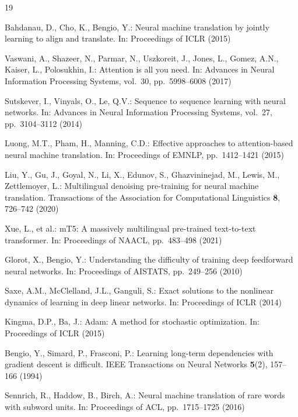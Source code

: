 \documentclass[runningheads]{llncs}
\begin{document}

\begin{thebibliography}{19}

Bahdanau, D., Cho, K., Bengio, Y.:
Neural machine translation by jointly learning to align and translate.
In: Proceedings of ICLR (2015)

Vaswani, A., Shazeer, N., Parmar, N., Uszkoreit, J., Jones, L., Gomez, A.N.,
Kaiser, L., Polosukhin, I.:
Attention is all you need.
In: Advances in Neural Information Processing Systems, vol.~30,
pp.~5998--6008 (2017)

Sutskever, I., Vinyals, O., Le, Q.V.:
Sequence to sequence learning with neural networks.
In: Advances in Neural Information Processing Systems, vol.~27,
pp.~3104--3112 (2014)

Luong, M.T., Pham, H., Manning, C.D.:
Effective approaches to attention-based neural machine translation.
In: Proceedings of EMNLP, pp.~1412--1421 (2015)

Liu, Y., Gu, J., Goyal, N., Li, X., Edunov, S., Ghazvininejad, M.,
Lewis, M., Zettlemoyer, L.:
Multilingual denoising pre-training for neural machine translation.
Transactions of the Association for Computational Linguistics \textbf{8},
726--742 (2020)

Xue, L., et al.:
mT5: A massively multilingual pre-trained text-to-text transformer.
In: Proceedings of NAACL, pp.~483--498 (2021)

Glorot, X., Bengio, Y.:
Understanding the difficulty of training deep feedforward neural networks.
In: Proceedings of AISTATS, pp.~249--256 (2010)

Saxe, A.M., McClelland, J.L., Ganguli, S.:
Exact solutions to the nonlinear dynamics of learning in deep linear networks.
In: Proceedings of ICLR (2014)

Kingma, D.P., Ba, J.:
Adam: A method for stochastic optimization.
In: Proceedings of ICLR (2015)

Bengio, Y., Simard, P., Frasconi, P.:
Learning long-term dependencies with gradient descent is difficult.
IEEE Transactions on Neural Networks \textbf{5}(2), 157--166 (1994)

Sennrich, R., Haddow, B., Birch, A.:
Neural machine translation of rare words with subword units.
In: Proceedings of ACL, pp.~1715--1725 (2016)


\end{thebibliography}
\end{document}
